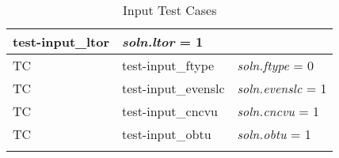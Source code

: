 \documentclass[12pt, titlepage]{article}
\newcounter{utestnum} %
\begin{document}
\begin{longtable}{  l  p{4cm}  p{6cm}  }
	test-input\_ltor &  \textit{soln.ltor} = 1\\ 
	\hline
	TC{utestnum}\theutestnum  \label{TC_InputFtype} & 
	test-input\_ftype &  \textit{soln.ftype} = 0\\ 
	\hline
	TC{utestnum}\theutestnum  \label{TC_InputEvenslc} & 
	test-input\_evenslc &  \textit{soln.evenslc} = 1\\ 
	\hline
	TC{utestnum}\theutestnum  \label{TC_InputCncvu} & 
	test-input\_cncvu &  \textit{soln.cncvu} = 1\\ 
	\hline
	TC{utestnum}\theutestnum  \label{TC_InputObtu} & 
	test-input\_obtu &  \textit{soln.obtu} = 1\\ 
	\hline
	\caption{Input Test Cases}
	\label{InputTests}
\end{longtable}

\end{document}
